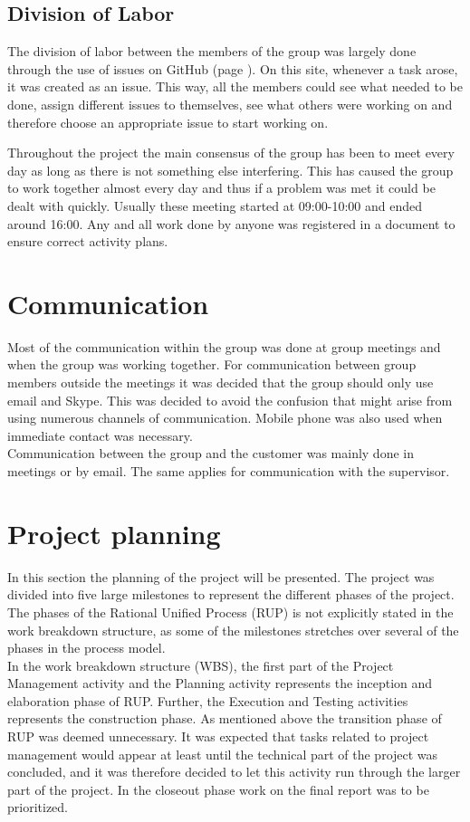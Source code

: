 \subsection{Division of Labor}
The division of labor between the members of the group was largely done through the use of issues on GitHub (page \pageref{GitHub}). On this site, whenever a task arose, it was created as an issue. This way, all the members could see what needed to be done, assign different issues to themselves, see what others were working on and therefore choose an appropriate issue to start working on.

Throughout the project the main consensus of the group has been to meet every day as long as there is not something else interfering. This has caused the group to work together almost every day and thus if a problem was met it could be dealt with quickly. Usually these meeting started at 09:00-10:00 and ended around 16:00. Any and all work done by anyone was registered in a document to ensure correct activity plans.

\section{Communication}
Most of the communication within the group was done at group meetings and when the group was working together. For communication between group members outside the meetings it was decided that the group should only use email and Skype. This was decided to avoid the confusion that might arise from using numerous channels of communication. Mobile phone was also used when immediate contact was necessary.\\
\newline
Communication between the group and the customer was mainly done in meetings or by email. The same applies for communication with the supervisor.

\section{Project planning}

\label{projectplanning}

In this section the planning of the project will be presented. The project was divided into five large milestones to represent the different phases of the project. The phases of the Rational Unified Process (RUP) is not explicitly stated in the work breakdown structure, as some of the milestones stretches over several of the phases in the process model. \\
\newline
In the work breakdown structure (WBS), the first part of the Project Management activity and the Planning activity represents the inception and elaboration phase of RUP. Further, the Execution and Testing activities represents the construction phase. As mentioned above the transition phase of RUP was deemed unnecessary. It was expected that tasks related to project management would appear at least until the technical part of the project was concluded, and it was therefore decided to let this activity run through the larger part of the project. In the closeout phase work on the final report was to be prioritized.

